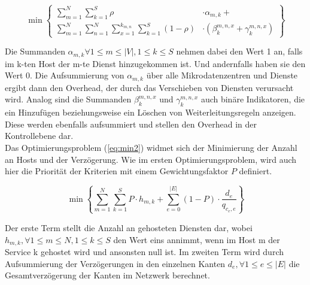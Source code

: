 \documentclass[conference]{IEEEtran}
\begin{document}
\begin{equation}
     \min\left\{\begin{split} \sum\limits_{m=1}^N \sum\limits_{k=1}^S \rho &\cdot\alpha_{m,k} + \\
         \sum\limits_{m=1}^N \sum\limits_{n=1}^N \sum\limits_{x=1}^{k_{m,n}}
\sum\limits_{k=1}^S (1-\rho)&\cdot(\beta_{k}^{m,n,x}+ \gamma_{k}^{m,n,x})\end{split}\right\}
\label{eq:min1}
\end{equation}

Die Summanden \(\alpha_{m,k} \forall 1\le m \le |V|, 1 \le k \le S\) nehmen dabei den Wert 1 an, falls im k-ten Host der m-te Dienst hinzugekommen ist. Und andernfalls haben sie den Wert 0. Die Aufsummierung von \(\alpha_{m,k}\) über alle Mikrodatenzentren und Dienste ergibt dann den Overhead, der durch das Verschieben von Diensten verursacht wird. 
Analog sind die Summanden \(\beta_{k}^{m,n,x}\) und \(\gamma_{k}^{m,n,x}\) auch binäre Indikatoren, die ein Hinzufügen beziehungsweise ein Löschen von Weiterleitungsregeln anzeigen. Diese werden ebenfalls aufsummiert und stellen den Overhead in der Kontrollebene dar.\\
Das Optimierungsproblem (\ref{eq:min2}) widmet sich der Minimierung der Anzahl an Hosts und der Verzögerung. Wie im ersten Optimierungsproblem, wird auch hier die Priorität der Kriterien mit einem Gewichtungsfaktor \(P\) definiert.

\begin{equation}
\min \left\{ \sum_{m=1}^N \sum_{k=1}^S P \cdot h_{m,k} + \sum_{e=0}^{|E|} (1-P) \cdot \frac{d_e}{q_{c_{e},e}} \right\}
\label{eq:min2}
\end{equation}

Der erste Term stellt die Anzahl an gehosteten Diensten dar, wobei \(h_{m,k},\forall 1 \le m \le N, 1\le k \le S\) den Wert eins annimmt, wenn im Host m der Service k gehostet wird und ansonsten null ist.
Im zweiten Term wird durch Aufsummierung der Verzögerungen in den einzelnen Kanten \(d_e, \forall 1 \le e \le |E|\) die Gesamtverzögerung der Kanten im Netzwerk berechnet.
\end{document}
